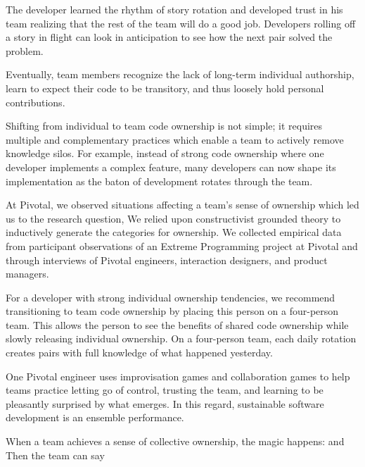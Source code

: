 The developer learned the rhythm of story rotation and developed trust in his team realizing that the rest of the team will do a good job. Developers rolling off a story in flight can look in anticipation to see how the next pair solved the problem. 

Eventually, team members recognize the lack of long-term individual authorship, learn to expect their code to be transitory, and thus loosely hold personal contributions.   

Shifting from individual to team code ownership is not simple; it requires multiple and complementary practices which enable a team to actively remove knowledge silos. For example, instead of strong code ownership where one developer implements a complex feature, many developers can now shape its implementation as the baton of development rotates through the team. 

At Pivotal, we observed situations affecting a team's sense of ownership which led us to the research question,  We relied upon constructivist grounded theory to inductively generate the categories for ownership. We collected empirical data from participant observations of an Extreme Programming project at Pivotal and through interviews of Pivotal engineers, interaction designers, and product managers. 

For a developer with strong individual ownership tendencies, we recommend transitioning to team code ownership by placing this person on a four-person team. This allows the person to see the benefits of shared code ownership while slowly releasing individual ownership. On a four-person team, each daily rotation creates pairs with full knowledge of what happened yesterday.  

One Pivotal engineer uses improvisation games and collaboration games to help teams practice letting go of control, trusting the team, and learning to be pleasantly surprised by what emerges. In this regard, sustainable software development is an ensemble performance. 

When a team achieves a sense of collective ownership, the magic happens:  and  Then the team can say 


